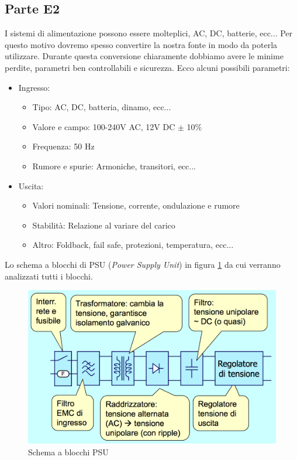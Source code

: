\documentclass[12pt]{article}
\begin{document}
\subsection{Parte E2}\label{e2} %
I sistemi di alimentazione possono essere molteplici, AC, DC, batterie, ecc... Per questo motivo dovremo spesso convertire la nostra fonte in modo da poterla utilizzare. Durante questa conversione chiaramente dobbiamo avere le minime perdite, parametri ben controllabili e sicurezza. Ecco alcuni possibili parametri:
\begin{itemize}
  \item Ingresso:
  \begin{itemize}
    \item Tipo: AC, DC, batteria, dinamo, ecc...
    \item Valore e campo: 100-240V AC, 12V DC $\pm$ 10\%
    \item Frequenza: 50 Hz
    \item Rumore e spurie: Armoniche, transitori, ecc...
  \end{itemize}
  \item Uscita:
  \begin{itemize}
    \item Valori nominali: Tensione, corrente, ondulazione e rumore
    \item Stabilità: Relazione al variare del carico
    \item Altro: Foldback, fail safe, protezioni, temperatura, ecc...
  \end{itemize}
\end{itemize}

Lo schema a blocchi di PSU (\textit{Power Supply Unit}) in figura \ref{fig:psu} da cui verranno analizzati tutti i blocchi.

\begin{figure}[!hpt]
  \includegraphics[width=\textwidth]{images/psu.png}
  \caption{Schema a blocchi PSU}
  \label{fig:psu}
\end{figure}
\end{document}

